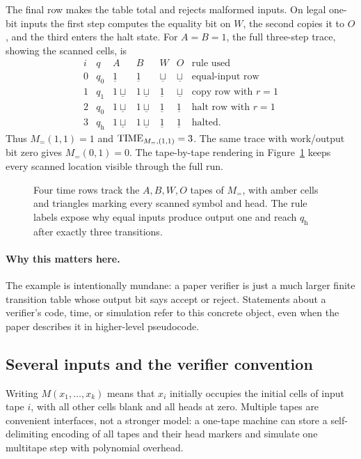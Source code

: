 The final row makes the table total and rejects malformed inputs.  On legal
one-bit inputs the first step computes the equality bit on \(W\), the second
copies it to \(O\), and the third enters the halt state.  For \(A=B=1\), the
full three-step trace, showing the scanned cells, is
\[
\begin{array}{c|c|c|c|c|c|l}
i&q&A&B&W&O&\text{rule used}\\ \hline
0&q_0&\underline1&\underline1&\underline\sqcup&\underline\sqcup
  &\text{equal-input row}\\
1&q_1&1\underline\sqcup&1\underline\sqcup&\underline1&\underline\sqcup
  &\text{copy row with }r=1\\
2&q_0&1\underline\sqcup&1\underline\sqcup&\underline1&\underline1
  &\text{halt row with }r=1\\
3&q_{\mathrm h}&1\underline\sqcup&1\underline\sqcup&\underline1&\underline1
  &\text{halted.}
\end{array}
\]
Thus \(M_{=}(1,1)=1\) and \(\operatorname{TIME}_{M_=,(1,1)}=3\).  The same trace with
work/output bit zero gives \(M_{=}(0,1)=0\).
The tape-by-tape rendering in Figure~\ref{fig:eq-machine-trace} keeps every
scanned location visible through the full run.

\begin{figure}[t]
\centering

\caption{Four time rows track the \(A,B,W,O\) tapes of \(M_=\), with amber cells and triangles marking every scanned symbol and head.  The rule labels expose why equal inputs produce output one and reach \(q_{\mathrm h}\) after exactly three transitions.}
\label{fig:eq-machine-trace}
\end{figure}

\paragraph{Why this matters here.}
The example is intentionally mundane: a paper verifier is just a much larger
finite transition table whose output bit says accept or reject.  Statements
about a verifier's code, time, or simulation refer to this concrete object,
even when the paper describes it in higher-level pseudocode.

\subsection{Several inputs and the verifier convention}

Writing \(M(x_1,\ldots,x_k)\) means that \(x_i\) initially occupies the
initial cells of input tape \(i\), with all other cells blank and all heads at
zero.  Multiple tapes are convenient interfaces, not a stronger model: a
one-tape machine can store a self-delimiting encoding of all tapes and their
head markers and simulate one multitape step with polynomial overhead.

